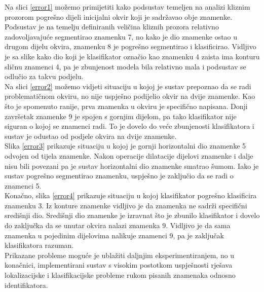 \documentclass[times, utf8, diplomski]{fer}
\theoremstyle{definition}
\begin{document}
Na slici \ref{error1} možemo primijetiti kako podsustav temeljen na analizi kliznim prozorom pogrešno dijeli inicijalni okvir koji je sadržavao obje znamenke. Podsustav je na temelju definiranih veličina kliznih prozora relativno zadovoljavajuće segmentirao znamenku 7, no kako je dio znamenke ostao u drugom dijelu okvira, znamenku 8 je pogrešno segmentirao i klasificirao. Vidljivo je sa slike kako dio koji je klasifikator označio kao znamenku 4 zaista ima konturu sličnu znamenci 4, pa je zbunjenost modela bila relativno mala i podsustav se odlučio za takvu podjelu. \\
Na slici \ref{error2} možemo vidjeti situaciju u kojoj je sustav prepoznao da se radi problematičnom okviru, no nije uspješno podijelio okvir na dvije znamenke.  Kao što je spomenuto ranije, prva znamenka u okviru je specifično napisana. Donji završetak znamenke 9 je spojen s gornjim dijelom, pa tako klasifikator nije siguran o kojoj se znamenci radi. To je dovelo do veće zbunjenosti klasifikatora i sustav je odustao od podjele okvira na dvije znamenke.\\
Slika \ref{error3} prikazuje situaciju u kojoj je gornji horizontalni dio znamenke 5 odvojen od tijela znamenke. Nakon operacije dilatacije dijelovi znamenke i dalje nisu bili povezani pa je sustav horizontalni dio znamenke smatrao šumom. Iako je sustav pogrešno segmentirao znamenku, uspješno je zaključio da se radi o znamenci 5.  \\
Konačno, slika \ref{error4} prikazuje situaciju u kojoj klasifikator pogrešno klasificira znamenku 3. Iz konture znamenke vidljivo je da znamenka ne sadrži specifični središnji dio. Središnji dio znamenke je izravnat što je zbunilo klasifikator i dovelo do zaključka da se unutar okvira nalazi znamenka 9. Vidljivo je da sama znamenka u pojedinim dijelovima nalikuje znamenci 9, pa je zaključak klasifikatora razuman. \\ 
Prikazane probleme moguće je ublažiti daljnjim eksperimentiranjem, no u konačnici, implementirani sustav s visokim postotkom uspješnosti rješava lokalizacijske i klasifikacijske probleme rukom pisanih znamenaka odnosno identifikatora. 
\end{document}
